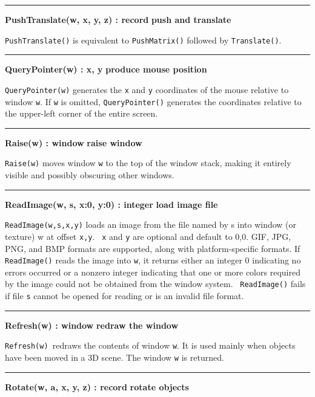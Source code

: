 \bigskip\hrule\vspace{0.1cm}
\noindent
{\bf PushTranslate(w, x, y, z) : record } \hfill {\bf push and translate}

\noindent
\texttt{PushTranslate()} is equivalent to \texttt{PushMatrix()} followed
by \texttt{Translate()}.

\bigskip\hrule\vspace{0.1cm}
\noindent
{\bf QueryPointer(w) : x, y } \hfill {\bf produce mouse position}

\noindent
\texttt{QueryPointer(w)} generates the \texttt{x} and \texttt{y}
coordinates of the mouse relative to window \texttt{w}. If \texttt{w}
is omitted, \texttt{QueryPointer()} generates the coordinates relative
to the upper-left corner of the entire screen.

\bigskip\hrule\vspace{0.1cm}
\noindent
{\bf Raise(w) : window } \hfill {\bf raise window}

\noindent
\texttt{Raise(w)} moves window \texttt{w} to the top of the window
stack, making it entirely visible and possibly obscuring other windows.

\bigskip\hrule\vspace{0.1cm}
\noindent
{\bf ReadImage(w, s, x:0, y:0) : integer } \hfill {\bf load image file}

\noindent
\texttt{ReadImage(w,s,x,y)} loads an image from the file named by s into
window (or texture) w at offset \texttt{x,y}. \texttt{\ x} and \texttt{y} are
optional and default to 0,0. GIF, JPG, PNG, and BMP formats are supported,
along with platform-specific formats. If \texttt{ReadImage()} reads the
image into \texttt{w}, it returns either an integer 0 indicating no
errors occurred or a nonzero integer indicating that one or more colors
required by the image could not be obtained from the window system.
\ \texttt{ReadImage()} fails if file \texttt{s} cannot be opened for
reading or is an invalid file format.

\bigskip\hrule\vspace{0.1cm}
\noindent
{\bf Refresh(w) : window } \hfill {\bf redraw the window}

\noindent
\texttt{Refresh(w) }redraws the contents of window \texttt{w}. It is
used mainly when objects have been moved in a 3D scene. The window
\texttt{w} is returned. 

\bigskip\hrule\vspace{0.1cm}
\noindent
{\bf Rotate(w, a, x, y, z) : record } \hfill {\bf rotate objects}

